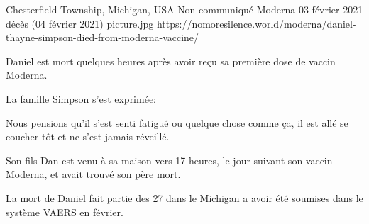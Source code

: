           {Chesterfield Township, Michigan, USA}
          {Non communiqué}
          {Moderna}
          {03 février 2021}
          {décès (04 février 2021)}
          {picture.jpg}
          {https://nomoresilence.world/moderna/daniel-thayne-simpson-died-from-moderna-vaccine/}
          {

Daniel est mort quelques heures après avoir reçu sa première dose de vaccin
Moderna.

La famille Simpson s'est exprimée:

Nous pensions qu'il s'est senti fatigué ou quelque chose comme ça, il est allé
se coucher tôt et ne s'est jamais réveillé.

Son fils Dan est venu à sa maison vers 17 heures, le jour suivant son vaccin
Moderna, et avait trouvé son père mort.

La mort de Daniel fait partie des 27 dans le Michigan a avoir été soumises dans
le système VAERS en février.

}
